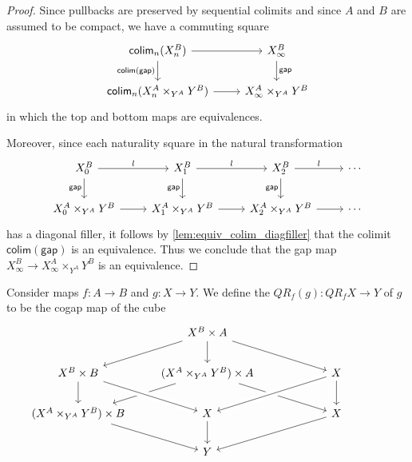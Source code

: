 \begin{proof}
Since pullbacks are preserved by sequential colimits and since $A$ and $B$ are assumed to be compact, we have a commuting square
\begin{equation*}
\begin{tikzcd}
\mathsf{colim}_n(X_n^B) \arrow[r] \arrow[d,swap,"\mathsf{colim}(\mathsf{gap})"] & X_\infty^B \arrow[d,"\mathsf{gap}"] \\
\mathsf{colim}_n(X_n^A\times_{Y^A}Y^B) \arrow[r] & X_\infty^A\times_{Y^A}Y^B
\end{tikzcd}
\end{equation*}
in which the top and bottom maps are equivalences.

Moreover, since each naturality square in the natural transformation
\begin{equation*}
\begin{tikzcd}
X_0^B \arrow[r,"l"] \arrow[d,swap,"\mathsf{gap}"] & X_1^B \arrow[r,"l"] \arrow[d,swap,"\mathsf{gap}"] & X_2^B \arrow[r,"l"] \arrow[d,swap,"\mathsf{gap}"] & \cdots \\
X_0^A\times_{Y^A} Y^B \arrow[r] & X_1^A\times_{Y^A}Y^B \arrow[r] & X_2^A\times_{Y^A}Y^B \arrow[r] & \cdots
\end{tikzcd}
\end{equation*}
has a diagonal filler, it follows by \cref{lem:equiv_colim_diagfiller} that the colimit $\mathsf{colim}(\mathsf{gap})$ is an equivalence. Thus we conclude that the gap map $X_\infty^B\to X_\infty^A\times_{Y^A}Y^B$ is an equivalence.
\end{proof}

\begin{defn}
Consider maps $f:A\to B$ and $g:X\to Y$. We define the  $QR_f(g):QR_f X\to Y$
of $g$ to be the cogap map of the cube
\begin{equation*}
\begin{tikzcd}
& X^B\times A \arrow[dl] \arrow[dr] \arrow[d] & \phantom{(X^A\times_{Y^A}Y^B)\times B} \\
X^B \times B \arrow[d] & (X^A\times_{Y^A} Y^B)\times A \arrow[dl] \arrow[dr] & X \arrow[dl,crossing over] \arrow[d] \\
(X^A\times_{Y^A}Y^B)\times B \arrow[dr] & X \arrow[from=ul,crossing over] \arrow[d] & X \arrow[dl] \\
& Y
\end{tikzcd}
\end{equation*}
\end{defn}

